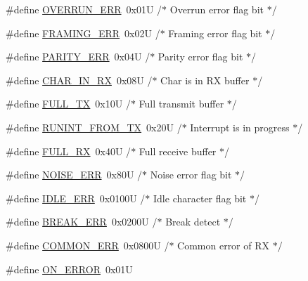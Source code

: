 \begin{DoxyCompactItemize}
\item 
\#define \hyperlink{group___a_s1__module_ga59f58864bb61f9450d236b712214a9d0}{O\+V\+E\+R\+R\+U\+N\+\_\+\+E\+RR}~0x01\+U         /$\ast$ Overrun error flag bit    $\ast$/
\item 
\#define \hyperlink{group___a_s1__module_ga19cf3fb3576b5fa62d2a0d781e2a724b}{F\+R\+A\+M\+I\+N\+G\+\_\+\+E\+RR}~0x02\+U         /$\ast$ Framing error flag bit    $\ast$/
\item 
\#define \hyperlink{group___a_s1__module_gac8a34f3fae782b1f62195c0d8f1d5d38}{P\+A\+R\+I\+T\+Y\+\_\+\+E\+RR}~0x04\+U         /$\ast$ Parity error flag bit     $\ast$/
\item 
\#define \hyperlink{group___a_s1__module_ga99960abe909f47f501b4c31003fbcade}{C\+H\+A\+R\+\_\+\+I\+N\+\_\+\+RX}~0x08\+U         /$\ast$ Char is in R\+X buffer      $\ast$/
\item 
\#define \hyperlink{group___a_s1__module_ga4642a25898b62e449c4f53559e7fdd5a}{F\+U\+L\+L\+\_\+\+TX}~0x10\+U         /$\ast$ Full transmit buffer      $\ast$/
\item 
\#define \hyperlink{group___a_s1__module_gaf4dcc39d70d3e855818d2a06f0f88adc}{R\+U\+N\+I\+N\+T\+\_\+\+F\+R\+O\+M\+\_\+\+TX}~0x20\+U         /$\ast$ Interrupt is in progress  $\ast$/
\item 
\#define \hyperlink{group___a_s1__module_ga548b5122de8b4aa86a3098e1a45c447f}{F\+U\+L\+L\+\_\+\+RX}~0x40\+U         /$\ast$ Full receive buffer       $\ast$/
\item 
\#define \hyperlink{group___a_s1__module_ga826432ddfcc8e042fb9781a5b325d962}{N\+O\+I\+S\+E\+\_\+\+E\+RR}~0x80\+U         /$\ast$ Noise error flag bit      $\ast$/
\item 
\#define \hyperlink{group___a_s1__module_ga4584e89e739c19496724ba117e62aed9}{I\+D\+L\+E\+\_\+\+E\+RR}~0x0100\+U       /$\ast$ Idle character flag bit   $\ast$/
\item 
\#define \hyperlink{group___a_s1__module_ga0cb4d61ee3347eb62142ca0eb1d02a53}{B\+R\+E\+A\+K\+\_\+\+E\+RR}~0x0200\+U       /$\ast$ Break detect              $\ast$/
\item 
\#define \hyperlink{group___a_s1__module_ga86e7d2a6a6227d9fbb84d459454c2359}{C\+O\+M\+M\+O\+N\+\_\+\+E\+RR}~0x0800\+U       /$\ast$ Common error of R\+X       $\ast$/
\item 
\#define \hyperlink{group___a_s1__module_gab5034f048fef6a41e7901a4e34368f3d}{O\+N\+\_\+\+E\+R\+R\+OR}~0x01U
\item 

\end{DoxyCompactItemize}
